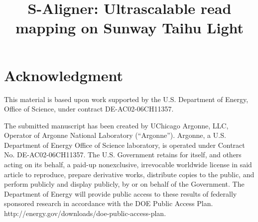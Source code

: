 \documentclass[conference]{IEEEtran}
\begin{document}
\title{S-Aligner: Ultrascalable read mapping on Sunway Taihu Light}

\author{
\and
{}
\and
{}
\and
{}
}

\maketitle


\IEEEpeerreviewmaketitle







\section*{Acknowledgment}
This material is based upon work supported by the U.S. Department of
Energy, Office of Science, under contract DE-AC02-06CH11357.




\vspace{20pt} \footnotesize{The submitted manuscript has been created
  by UChicago Argonne, LLC, Operator of Argonne National Laboratory
  (``Argonne'').  Argonne, a U.S. Department of Energy Office of
  Science laboratory, is operated under Contract
  No. DE-AC02-06CH11357. The U.S. Government retains for itself, and
  others acting on its behalf, a paid-up nonexclusive, irrevocable
  worldwide license in said article to reproduce, prepare derivative
  works, distribute copies to the public, and perform publicly and
  display publicly, by or on behalf of the Government.  The Department
  of Energy will provide public access to these results of federally
  sponsored research in accordance with the DOE Public Access
  Plan. http://energy.gov/downloads/doe-public-access-plan.}
\end{document}
